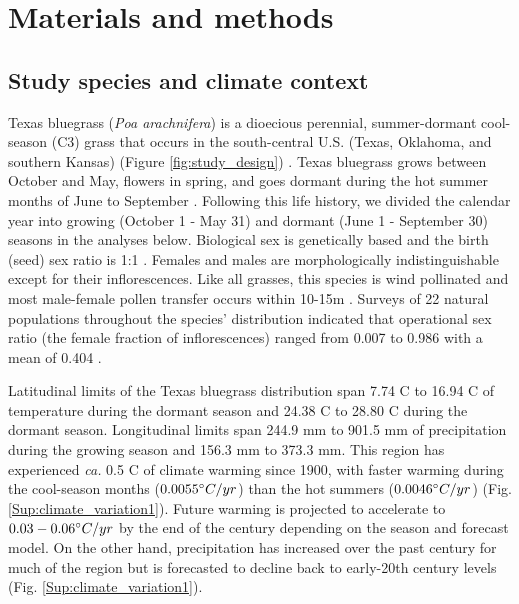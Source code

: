 \documentclass[12pt]{article}\usepackage[]{graphicx}\usepackage[dvipsnames]{xcolor}
\begin{document}
\section*{Materials and methods}
\subsection*{Study species and climate context}
Texas bluegrass (\textit{Poa arachnifera}) is a dioecious perennial, summer-dormant cool-season (C3) grass that occurs in the south-central U.S. (Texas, Oklahoma, and southern Kansas) (Figure \ref{fig:study_design}) \citep{hitchcock1971manual}. 
Texas bluegrass grows between October and May, flowers in spring, and goes dormant during the hot summer months of June to September \citep{kindiger2004interspecific}. 
Following this life history, we divided the calendar year into growing (October 1 - May 31) and dormant (June 1 - September 30) seasons in the analyses below. 
Biological sex is genetically based and the birth (seed) sex ratio is 1:1 \citep{renganayaki2005identification}. 
Females and males are morphologically indistinguishable except for their inflorescences. 
Like all grasses, this species is wind pollinated \citep{hitchcock1971manual} and most male-female pollen transfer occurs within 10-15m \citep{compagnoni2017can}. 
Surveys of 22 natural populations throughout the species' distribution indicated that operational sex ratio (the female fraction of inflorescences) ranged from 0.007 to 0.986 with a mean of 0.404 \citep{miller2022two}. 

Latitudinal limits of the Texas bluegrass distribution span 7.74 \degree C to 16.94 \degree C of temperature during the dormant season and 24.38 \degree C to 28.80 \degree C  during the dormant season. 
Longitudinal limits span 244.9 mm to 901.5 mm of precipitation during the growing season and 156.3 mm to 373.3 mm. 
This region has experienced \textit{ca.} 0.5 \degree C of climate warming since 1900, with faster warming  during the cool-season months ($0.0055 \degree C / yr$) than the hot summers ($0.0046\degree C / yr$) (Fig. \ref{Sup:climate_variation1}).
Future warming is projected to accelerate to $0.03-0.06\degree C / yr$ by the end of the century depending on the season and forecast model. 
On the other hand, precipitation has increased over the past century for much of the region but is forecasted to decline back to early-20th century levels (Fig. \ref{Sup:climate_variation1}). 
\end{document}
